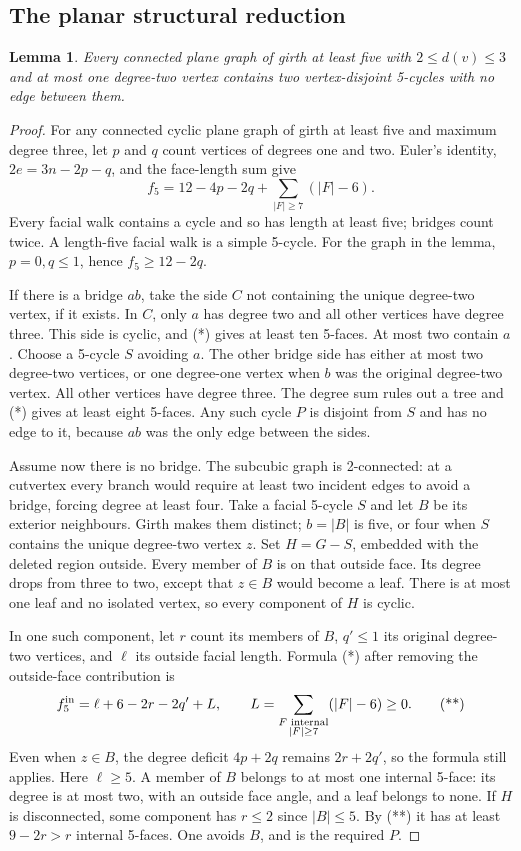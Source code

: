 \documentclass[11pt]{article}
\newtheorem{lemma}[theorem]{Lemma}
\theoremstyle{remark}
\numberwithin{equation}{section}
\numberwithin{table}{section}
\begin{document}
\subsection{The planar structural reduction}
\begin{lemma}\label{lem:two-separated-five-faces}
Every connected plane graph of girth at least five with
$2\le d(v)\le3$ and at most one degree-two vertex contains
two vertex-disjoint 5-cycles with no edge between them.
\end{lemma}
\begin{proof}
For any connected cyclic plane graph of girth at least five and
maximum degree three, let $p$ and $q$ count vertices of degrees one
and two. Euler's identity, $2e=3n-2p-q$, and the face-length sum give
\[
 f_5=12-4p-2q+\sum_{|F|\ge7}(|F|-6).                 \tag{*}
\]
Every facial walk contains a cycle and so has length at least five;
bridges count twice. A length-five facial walk is a simple 5-cycle.
For the graph in the lemma, $p=0,q\le1$, hence $f_5\ge12-2q$.

If there is a bridge $ab$, take the side $C$ not containing the
unique degree-two vertex, if it exists. In $C$, only $a$ has degree
two and all other vertices have degree three. This side is cyclic,
and (*) gives at least ten 5-faces. At most two contain $a$.
Choose a 5-cycle $S$ avoiding $a$. The other bridge side has either
at most two degree-two vertices, or one degree-one vertex when
$b$ was the original degree-two vertex. All other vertices have
degree three. The degree sum rules out a tree and (*) gives at
least eight 5-faces. Any such cycle $P$ is disjoint from $S$ and
has no edge to it, because $ab$ was the only edge between the sides.

Assume now there is no bridge. The subcubic graph is 2-connected:
at a cutvertex every branch would require at least two incident
edges to avoid a bridge, forcing degree at least four.
Take a facial 5-cycle $S$ and let $B$ be its exterior neighbours.
Girth makes them distinct; $b=|B|$ is five, or four when $S$
contains the unique degree-two vertex $z$.
Set $H=G-S$, embedded with the deleted region outside.
Every member of $B$ is on that outside face. Its degree drops
from three to two, except that $z\in B$ would become a leaf.
There is at most one leaf and no isolated vertex, so every component
of $H$ is cyclic.

In one such component, let $r$ count its members of $B$, $q'\le1$
its original degree-two vertices, and $\ell$ its outside facial
length. Formula (*) after removing the outside-face contribution is
\[
 f^{\rm in}_5=\ell+6-2r-2q'+L,\qquad
 L=\sum_{\substack{F\text{ internal}\\|F|\ge7}}(|F|-6)\ge0.       \tag{**}
\]
Even when $z\in B$, the degree deficit $4p+2q$ remains
$2r+2q'$, so the formula still applies. Here $\ell\ge5$.
A member of $B$ belongs to at most one internal 5-face: its degree
is at most two, with an outside face angle, and a leaf belongs to none.
If $H$ is disconnected, some component has $r\le2$ since
$|B|\le5$. By (**) it has at least $9-2r>r$ internal 5-faces.
One avoids $B$, and is the required $P$.


\end{proof}
\end{document}
